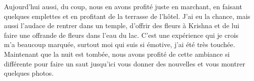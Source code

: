 \begin{multicols}{2}
Aujourd'hui aussi, du coup, nous en avons profité juste en marchant, en faisant quelques emplettes et en profitant de la terrasse de l'hôtel. J'ai eu la chance, mais aussi l'audace de rentrer dans un temple, d'offrir des fleurs à Krishna et de lui faire une offrande de fleurs dans l'eau du lac. C'est une expérience qui je crois m'a beaucoup marquée, surtout moi qui suis si émotive, j'ai été très touchée.  Maintenant que la nuit est tombée, nous avons profité de cette ambiance si différente pour faire un saut jusqu'ici vous donner des nouvelles et vous montrer quelques photos.


\end{multicols}


